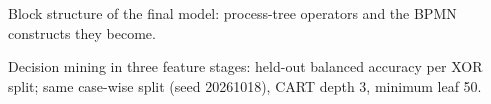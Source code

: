 \begin{table}[t]
\centering
\small
\caption{Block structure of the final model: process-tree operators and the BPMN constructs they become.}
\label{tab:block-structure}

\end{table}

\begin{table}[t]
\centering
\small
\caption{Decision mining in three feature stages: held-out balanced accuracy per XOR split; same case-wise split (seed 20261018), CART depth 3, minimum leaf 50.}
\label{tab:feature-stages}

\end{table}


